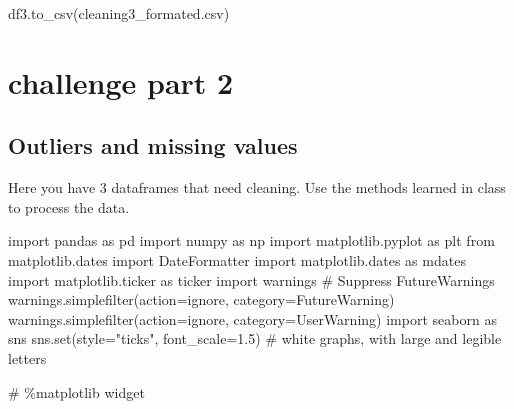 \documentclass[
  letterpaper,
  DIV=11,
  numbers=noendperiod,
  oneside]{scrreprt}
\newenvironment{Shaded}{\begin{snugshade}}{\end{snugshade}}
\newcommand{\BuiltInTok}[1]{\textcolor[rgb]{0.00,0.23,0.31}{#1}}
\newcommand{\CommentTok}[1]{\textcolor[rgb]{0.37,0.37,0.37}{#1}}
\newcommand{\FloatTok}[1]{\textcolor[rgb]{0.68,0.00,0.00}{#1}}
\newcommand{\ImportTok}[1]{\textcolor[rgb]{0.00,0.46,0.62}{#1}}
\newcommand{\NormalTok}[1]{\textcolor[rgb]{0.00,0.23,0.31}{#1}}
\newcommand{\OperatorTok}[1]{\textcolor[rgb]{0.37,0.37,0.37}{#1}}
\newcommand{\PreprocessorTok}[1]{\textcolor[rgb]{0.68,0.00,0.00}{#1}}
\newcommand{\StringTok}[1]{\textcolor[rgb]{0.13,0.47,0.30}{#1}}
\begin{document}
\begin{Shaded}
\begin{Highlighting}[]
\NormalTok{df3.to\_csv(}\StringTok{\textquotesingle{}cleaning3\_formated.csv\textquotesingle{}}\NormalTok{)}
\end{Highlighting}
\end{Shaded}

\hypertarget{challenge-part-2}{%
\chapter{challenge part 2}\label{challenge-part-2}}

\hypertarget{outliers-and-missing-values}{%
\section{Outliers and missing
values}\label{outliers-and-missing-values}}

Here you have 3 dataframes that need cleaning. Use the methods learned
in class to process the data.

\begin{Shaded}
\begin{Highlighting}[]
\ImportTok{import}\NormalTok{ pandas }\ImportTok{as}\NormalTok{ pd}
\ImportTok{import}\NormalTok{ numpy }\ImportTok{as}\NormalTok{ np}
\ImportTok{import}\NormalTok{ matplotlib.pyplot }\ImportTok{as}\NormalTok{ plt}
\ImportTok{from}\NormalTok{ matplotlib.dates }\ImportTok{import}\NormalTok{ DateFormatter}
\ImportTok{import}\NormalTok{ matplotlib.dates }\ImportTok{as}\NormalTok{ mdates}
\ImportTok{import}\NormalTok{ matplotlib.ticker }\ImportTok{as}\NormalTok{ ticker}
\ImportTok{import}\NormalTok{ warnings}
\CommentTok{\# Suppress FutureWarnings}
\NormalTok{warnings.simplefilter(action}\OperatorTok{=}\StringTok{\textquotesingle{}ignore\textquotesingle{}}\NormalTok{, category}\OperatorTok{=}\PreprocessorTok{FutureWarning}\NormalTok{)}
\NormalTok{warnings.simplefilter(action}\OperatorTok{=}\StringTok{\textquotesingle{}ignore\textquotesingle{}}\NormalTok{, category}\OperatorTok{=}\PreprocessorTok{UserWarning}\NormalTok{)}
\ImportTok{import}\NormalTok{ seaborn }\ImportTok{as}\NormalTok{ sns}
\NormalTok{sns.}\BuiltInTok{set}\NormalTok{(style}\OperatorTok{=}\StringTok{"ticks"}\NormalTok{, font\_scale}\OperatorTok{=}\FloatTok{1.5}\NormalTok{)  }\CommentTok{\# white graphs, with large and legible letters}

\CommentTok{\# \%matplotlib widget}
\end{Highlighting}
\end{Shaded}
\end{document}
